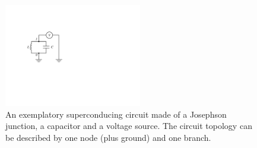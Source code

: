 \begin{figure}
	\includegraphics[width=6cm]{"./material/figures/introduction/sample_circuit"}
	\caption{An exemplatory superconducing circuit made of a Josephson junction, a capacitor and a voltage source. The circuit topology can be described by one node (plus ground) and one branch.}
	\label{fig:SampleCircuit}
\end{figure}

